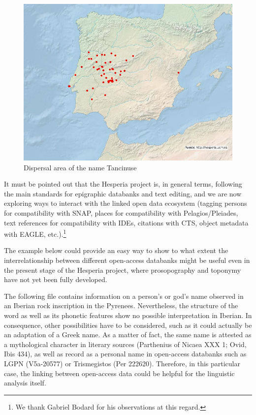 \documentclass[amsthm,ebook]{saparticle}
\begin{document}
\begin{figure}[!bp]
\centering
 \includegraphics[width=\columnwidth]{EpigraphyandonomasticsinHesperiadatabanktemplate-img009.jpg}
\caption{Dispersal area of the name Tancinuse}
\label{fig:9}
\end{figure}


It must be pointed out that the Hesperia project is, in general terms, following the main standards for epigraphic
databanks and text editing, and we are now exploring ways to interact with the linked open data ecosystem (tagging
persons for compatibility with SNAP, places for compatibility with Pelagios/Pleiades, text references for compatibility
with IDEs, citations with CTS, object metadata with EAGLE, etc.).\footnote{ We thank Gabriel Bodard for his
observations at this regard.} 

The example below could provide an easy way to show to what extent the interrelationship between different open-access
databanks might be useful even in the present stage of the Hesperia project, where prosopography and toponymy have not
yet been fully developed. 

The following file contains information on a person’s or god’s name observed in an Iberian rock inscription in the
Pyrenees. Nevertheless, the structure of the word as well as its phonetic features show no possible interpretation in
Iberian. In consequence, other possibilities have to be considered, such as it could actually be an adaptation of a
Greek name. As a matter of fact, the same name is attested as a mythological character in literary sources (Parthenius
of Nicaea XXX 1; Ovid, Ibis 434), as well as record as a personal name in open-access databanks such as LGPN
(V5a-20577) or Trismegistos (Per 222620). Therefore, in this particular case, the linking between open-access data
could be helpful for the linguistic analysis itself.
\end{document}
